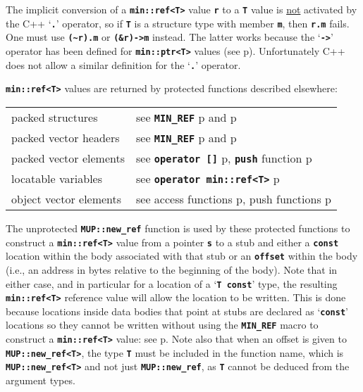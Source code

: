 \documentclass[12pt]{article}
\newcommand{\TT}[1]{{\tt \bfseries #1}}
\newcommand{\pagref}[1]{p\pageref{#1}}
\newcommand{\EOL}{\penalty \exhyphenpenalty}
\begin{document}
The implicit conversion of a \TT{min::\EOL ref<T>} value \TT{r} to a \TT{T}
value is \underline{not} activated by the C++ `\TT{.}' operator,
so if \TT{T} is a structure type with member \TT{m}, then \TT{r.m}
fails.  One must use \TT{(\textasciitilde r).m}
or \TT{(\&r)->m} instead.  The latter works because
the `\TT{->}' operator has been defined for \TT{min::\EOL ptr<T>}
values (see \pagref{PTR->}).
Unfortunately C++ does not allow a similar definition for the
`\TT{.}' operator.

\TT{min::ref<T>} values are returned by protected functions described
elsewhere:
\begin{center}
\begin{tabular}{ll}
packed structures & see \TT{MIN\_REF}
    \pagref{MIN_REF} and \pagref{PACKED_STRUCT_MIN_REF} \\
packed vector headers & see \TT{MIN\_REF}
    \pagref{MIN_REF} and \pagref{PACKED_VEC_MIN_REF} \\
packed vector elements	& see \TT{operator []}
    \pagref{MIN::PACKED_VEC_PTR_[]},
    \TT{push} function \pagref{MIN::PACKED_VEC_PUSH} \\
locatable variables	& see \TT{operator min::ref<T>}
    \pagref{LOCATABLE_VAR_REF} \\
object vector elements	& see access functions \pagref{OBJ_VEC_UPDPTR_REF},
			  push functions \pagref{OBJ_VEC_INSPTR_PUSH_REF}
\end{tabular}
\end{center}

The unprotected \TT{MUP::new\_ref} function is used by these
protected functions to construct a \TT{min::\EOL ref<T>} value
from a pointer \TT{s} to a stub and either a \TT{const} location
within the body associated with that stub or an \TT{offset}
within the body
(i.e., an address in bytes relative to the beginning of the body).
Note that in either case, and in particular for a location
of a `\TT{T const}' type, the resulting
\TT{min::\EOL ref<T>} reference value will allow the location
to be written.  This is done because locations inside data bodies
that point at stubs are declared as `\TT{const}' locations
so they cannot be written without using
the \TT{MIN\_\EOL REF} macro to construct a
\TT{min::\EOL ref<T>} value: see \pagref{MIN_REF_USAGE}.
Note also that when an offset is given to
\TT{MUP::\EOL new\_\EOL ref<T>}, the type \TT{T}
must be included in the function name,
which is \TT{MUP::\EOL new\_\EOL ref<T>}
and not just \TT{MUP::\EOL new\_\EOL ref}, as \TT{T} cannot
be deduced from the argument types.
\end{document}
